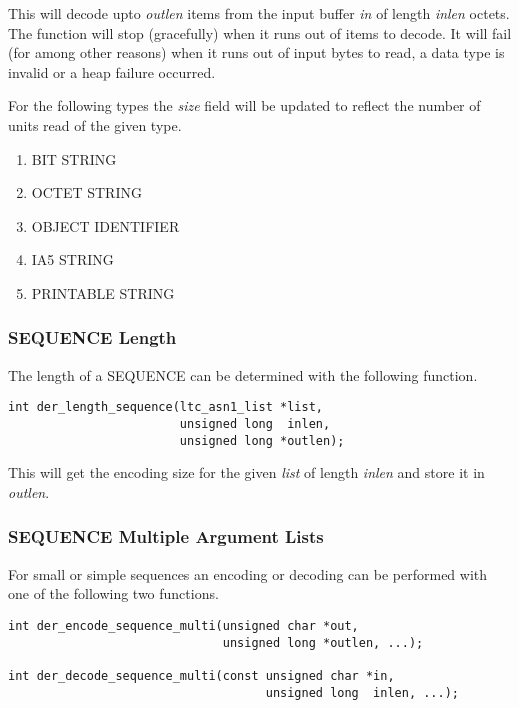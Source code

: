 \documentclass[synpaper]{book}
\begin{document}
This will decode upto \textit{outlen} items from the input buffer \textit{in} of length \textit{inlen} octets.  The function will stop (gracefully) when it runs out of items to decode.
It will fail (for among other reasons) when it runs out of input bytes to read, a data type is invalid or a heap failure occurred.

For the following types the \textit{size} field will be updated to reflect the number of units read of the given type.
\begin{enumerate}
   \item BIT STRING
   \item OCTET STRING
   \item OBJECT IDENTIFIER
   \item IA5 STRING
   \item PRINTABLE STRING
\end{enumerate}

\subsubsection{SEQUENCE Length}

The length of a SEQUENCE can be determined with the following function.

\begin{verbatim}
int der_length_sequence(ltc_asn1_list *list, 
                        unsigned long  inlen,
                        unsigned long *outlen);
\end{verbatim}

This will get the encoding size for the given \textit{list} of length \textit{inlen} and store it in \textit{outlen}.  

\subsubsection{SEQUENCE Multiple Argument Lists}

For small or simple sequences an encoding or decoding can be performed with one of the following two functions.


\begin{verbatim}
int der_encode_sequence_multi(unsigned char *out, 
                              unsigned long *outlen, ...);

int der_decode_sequence_multi(const unsigned char *in, 
                                    unsigned long  inlen, ...);
\end{verbatim}
\end{document}
